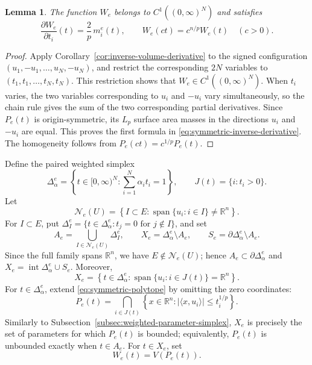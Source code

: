 \documentclass[12pt,reqno]{amsart}
\numberwithin{equation}{section}
\newtheorem{lemma}[theorem]{Lemma}
\theoremstyle{remark}
\DeclareMathOperator{\spanop}{span}
\newcommand{\R}{\mathbb R}
\newcommand{\Ncal}{\mathcal N}
\begin{document}
\begin{lemma}\label{lem:symmetric-volume}
	The function \(W_e\) belongs to \(C^1((0,\infty)^N)\) and satisfies
	\begin{equation}\label{eq:symmetric-inverse-derivative}
		\frac{\partial W_e}{\partial t_i}(t)
		=
		\frac2p\,m_i^e(t),
		\qquad
		W_e(ct)=c^{n/p}W_e(t)
		\quad(c>0).
	\end{equation}
\end{lemma}

\begin{proof}

	Apply Corollary~\ref{cor:inverse-volume-derivative} to the signed
	configuration
	\((u_1,-u_1,\ldots,u_N,-u_N)\), and restrict the corresponding
	\(2N\) variables to
	\((t_1,t_1,\ldots,t_N,t_N)\). This restriction shows that
	\(W_e\in C^1((0,\infty)^N)\). When \(t_i\) varies, the two variables
	corresponding to \(u_i\) and \(-u_i\) vary simultaneously, so the
	chain rule gives the sum of the two corresponding partial
	derivatives. Since \(P_e(t)\) is origin-symmetric, its \(L_p\)
	surface area masses in the directions \(u_i\) and \(-u_i\) are
	equal. This proves the first formula in
	\eqref{eq:symmetric-inverse-derivative}. 
	The homogeneity follows from 
	\(P_e(ct)=c^{1/p}P_e(t)\).

\end{proof}

Define the paired weighted simplex
\begin{equation}\label{eq:symmetric-weighted-simplex}
	\Delta_\alpha^e
	=
	\left\{t\in[0,\infty)^N:\sum_{i=1}^N\alpha_it_i=1\right\},
	\qquad
	J(t)=\{i:t_i>0\}.
\end{equation}
Let
\begin{equation}\label{eq:symmetric-nonspanning-complex}
	\Ncal_e(U)
	=
	\left\{I\subset E:\spanop\{u_i:i\in I\}\neq\R^n\right\}.
\end{equation}
For \(I\subset E\), put
\(\Delta_I^e=\{t\in\Delta_\alpha^e:t_j=0\text{ for }j\notin I\}\),
and set
\begin{equation}\label{eq:symmetric-AXS}
	A_e=\bigcup_{I\in\Ncal_e(U)}\Delta_I^e,
	\qquad
	X_e=\Delta_\alpha^e\setminus A_e,
	\qquad
	S_e=\partial\Delta_\alpha^e\setminus A_e.
\end{equation}
Since the full family spans \(\R^n\), we have
\(E\notin\Ncal_e(U)\); hence \(A_e\subset\partial\Delta_\alpha^e\) and
\(X_e=\operatorname{int}\Delta_\alpha^e\cup S_e\). Moreover,
\[
X_e
=
\left\{
t\in\Delta_\alpha^e:
\spanop\{u_i:i\in J(t)\}=\R^n
\right\}.
\]
For \(t\in\Delta_\alpha^e\), extend
\eqref{eq:symmetric-polytope} by omitting the zero coordinates:
\[
P_e(t)
=
\bigcap_{i\in J(t)}
\left\{
x\in\R^n:
|\langle x,u_i\rangle|\leq t_i^{1/p}
\right\}.
\]
Similarly to Subsection~\ref{subsec:weighted-parameter-simplex}, \(X_e\) is precisely the set of parameters for which
\(P_e(t)\) is bounded; equivalently, \(P_e(t)\) is unbounded
exactly when \(t\in A_e\). For \(t\in X_e\), set
\begin{equation}\label{eq:symmetric-boundary-functional}
	W_e(t)=V(P_e(t)).
\end{equation}
\end{document}
